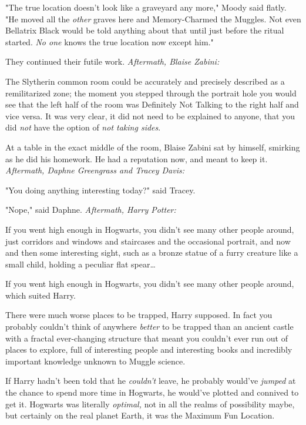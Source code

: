 "The true location doesn't look like a graveyard any more," Moody said flatly. 
"He moved all the \emph{other} graves here and Memory-Charmed the Muggles. Not 
even Bellatrix Black would be told anything about that until just before the 
ritual started. \emph{No one} knows the true location now except him."

They continued their futile work.
\sbreak
\emph{Aftermath, Blaise Zabini:}

The Slytherin common room could be accurately and precisely described as a 
remilitarized zone; the moment you stepped through the portrait hole you would 
see that the left half of the room was Definitely Not Talking to the right half 
and vice versa. It was very clear, it did not need to be explained to anyone, 
that you did \emph{not} have the option of \emph{not taking sides}.

At a table in the exact middle of the room, Blaise Zabini sat by himself, 
smirking as he did his homework. He had a reputation now, and meant to keep it.
\sbreak
\emph{Aftermath, Daphne Greengrass and Tracey Davis:}

"You doing anything interesting today?" said Tracey.

"Nope," said Daphne.
\sbreak
\emph{Aftermath, Harry Potter:}

If you went high enough in Hogwarts, you didn't see many other people around, 
just corridors and windows and staircases and the occasional portrait, and now 
and then some interesting sight, such as a bronze statue of a furry creature 
like a small child, holding a peculiar flat spear{\ldots}

If you went high enough in Hogwarts, you didn't see many other people around, 
which suited Harry.

There were much worse places to be trapped, Harry supposed. In fact you 
probably couldn't think of anywhere \emph{better} to be trapped than an ancient 
castle with a fractal ever-changing structure that meant you couldn't ever run 
out of places to explore, full of interesting people and interesting books and 
incredibly important knowledge unknown to Muggle science.

If Harry hadn't been told that he \emph{couldn't} leave, he probably would've 
\emph{jumped} at the chance to spend more time in Hogwarts, he would've plotted 
and connived to get it. Hogwarts was literally \emph{optimal,} not in all the 
realms of possibility maybe, but certainly on the real planet Earth, it was the 
Maximum Fun Location.

